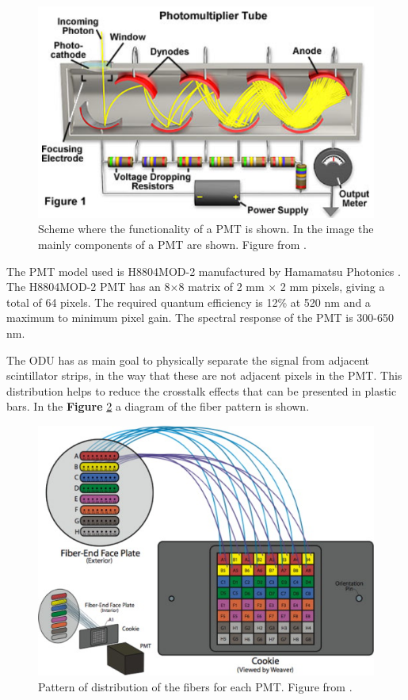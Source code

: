 \begin{figure}[!htb]
    \centering
    \includegraphics[scale=0.5]{Figures/Chapter2/PMT.png}
    \caption{Scheme where the functionality of a PMT is shown. In the image the mainly components of a PMT are shown. Figure from \cite{PMTHamamatsu}.}
    \label{fig:MnvExp:MnvDetector:PMTfunctionality}
\end{figure}



The PMT model used is H8804MOD-2 manufactured by Hamamatsu Photonics \cite{hamamatsu2007photomultiplier}. The H8804MOD-2 PMT has an 8$\times$8 matrix of 2 mm $\times$ 2 mm pixels, giving a total of 64 pixels. The required quantum efficiency is 12\% at 520 nm and a maximum to minimum pixel gain. The spectral response of the PMT is 300-650 nm.    

The ODU has as main goal to physically separate the signal from adjacent scintillator strips, in the way that these are not adjacent pixels in the PMT. This distribution helps to reduce the crosstalk effects that can be presented in plastic bars. In the \textbf{Figure} \ref{fig:MnvExp:MnvDetector:ODU} a diagram of the fiber pattern is shown. 

\begin{figure}[!htb]
    \centering
    \includegraphics{Figures/Chapter2/ODU.jpg}
    \caption{Pattern of distribution of the fibers for each PMT. Figure from \cite{MINERvA}.}
    \label{fig:MnvExp:MnvDetector:ODU}
\end{figure}

